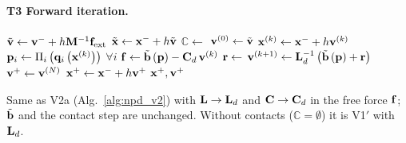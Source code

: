 \paragraph{T3 Forward iteration.}\mbox{}
\begin{algorithm}[H]
\caption{D: one PD step with damping and contact (\textsc{Forward} as in Alg.~\ref{alg:npd_v1}).}
\label{alg:npd_d}
\begin{algorithmic}[1]
    \State $\tilde{\mathbf{v}} \gets \mathbf{v}^- + h\mathbf{M}^{-1}\mathbf{f}_{\text{ext}}$
    \State $\tilde{\mathbf{x}} \gets \mathbf{x}^- + h\tilde{\mathbf{v}}$
    \State $\mathbb{C} \gets$ 
    \State $\mathbf{v}^{(0)} \gets \tilde{\mathbf{v}}$
        \State $\mathbf{x}^{(k)} \gets \mathbf{x}^- + h\mathbf{v}^{(k)}$
        \State $\mathbf{p}_i \gets \Pi_i\left(\mathbf{q}_i\left(\mathbf{x}^{(k)}\right)\right)$ \quad $\forall i$ 
        \State $\mathbf{f} \gets \tilde{\mathbf{b}}\left(\mathbf{p}\right) - \mathbf{C}_d\,\mathbf{v}^{(k)}$                              
        \State $\mathbf{r} \gets$                                                
        \State $\mathbf{v}^{(k+1)} \gets \mathbf{L}_d^{-1}\left(\tilde{\mathbf{b}}\left(\mathbf{p}\right) + \mathbf{r}\right)$          
    \EndFor
    \State $\mathbf{v}^+ \gets \mathbf{v}^{(N)}$
    \State $\mathbf{x}^+ \gets \mathbf{x}^- + h\mathbf{v}^+$
    \State \Return $\mathbf{x}^+, \mathbf{v}^+$
\EndFunction
\end{algorithmic}
\end{algorithm}
\noindent Same as V2a (Alg.~\ref{alg:npd_v2}) with $\mathbf{L} \to \mathbf{L}_d$ and $\mathbf{C} \to \mathbf{C}_d$ in the free force $\mathbf{f}$; $\tilde{\mathbf{b}}$ and the contact step are unchanged. Without contacts ($\mathbb{C} = \emptyset$) it is V1$'$ with $\mathbf{L}_d$.

